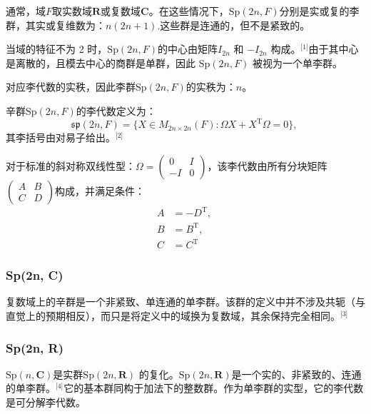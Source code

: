 通常，域$F$取实数域$\mathbf{R}$或复数域$\mathbf{C}$。在这些情况下，$\mathrm{Sp}(2n, F)$分别是实或复的李群，其实或复维数为：$n(2n+1)$.这些群是连通的，但不是紧致的。

当域的特征不为 2 时，$\mathrm{Sp}(2n, F)$的中心由矩阵$I_{2n}$ 和 $-I_{2n}$ 构成。\(^\text{[1]}\)由于其中心是离散的，且模去中心的商群是单群，因此 $\mathrm{Sp}(2n, F)$ 被视为一个单李群。

对应李代数的实秩，因此李群$\mathrm{Sp}(2n, F)$的实秩为：$n$。

辛群$\mathrm{Sp}(2n, F)$的李代数定义为：
$$
\mathfrak{sp}(2n,F) = \{ X \in M_{2n \times 2n}(F) : \Omega X + X^{\mathrm{T}} \Omega = 0 \},~
$$
其李括号由对易子给出。\(^\text{[2]}\)

对于标准的斜对称双线性型：$\Omega = \begin{pmatrix}0 & I \\- I & 0
\end{pmatrix}$，该李代数由所有分块矩阵$\begin{pmatrix}A & B \\C & D
\end{pmatrix}$构成，并满足条件：
$$
\begin{aligned}
A &= - D^{\mathrm{T}}, \\
B &= B^{\mathrm{T}}, \\
C &= C^{\mathrm{T}}
\end{aligned}~
$$
\subsubsection{Sp(2n, C)}
复数域上的辛群是一个非紧致、单连通的单李群。该群的定义中并不涉及共轭（与直觉上的预期相反），而只是将定义中的域换为复数域，其余保持完全相同。\(^\text{[3]}\)
\subsubsection{Sp(2n, R)}
$\mathrm{Sp}(n, \mathbf{C})$是实群$\mathrm{Sp}(2n, \mathbf{R})$ 的复化。$\mathrm{Sp}(2n, \mathbf{R})$是一个实的、非紧致的、连通的单李群。\(^\text{[4]}\)它的基本群同构于加法下的整数群。作为单李群的实型，它的李代数是可分解李代数。

